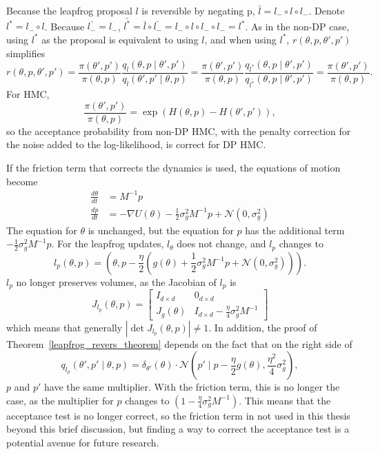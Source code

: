 \documentclass[english,twoside,openright]{HYgraduMLDS}
\newcommand{\caln}{{\mathcal{N}}}
\begin{document}
Because the leapfrog proposal \(l\) is reversible by negating p,
\(\bar{l} = l_{-} \circ l\circ l_{-}\). Denote \(l^{*} = l_{-}\circ l\).
Because \(\bar{l_{-}} = l_{-}\),
\(\bar{l^{*}} = \bar{l}\circ \bar{l_{-}}
= l_{-}\circ l\circ l_{-}\circ l_{-} = l^{*}\).
As in the non-DP case, using \(l^{*}\) as the proposal is equivalent to using
\(l\), and when using \(l^{*}\), \(r(\theta, p, \theta', p')\) simplifies
\[
  r(\theta, p, \theta', p')
  = \frac{\pi(\theta', p')}{\pi(\theta, p)}
  \frac{q_{l}(\theta, p\mid \theta', p')}{q_{l}(\theta', p'\mid \theta, p)}
  = \frac{\pi(\theta', p')}{\pi(\theta, p)}
  \frac{q_{l^{*}}(\theta, p\mid \theta', p')}{q_{\bar{l^{*}}}(\theta, p\mid \theta', p')}
  = \frac{\pi(\theta', p')}{\pi(\theta, p)}.
\]
For HMC,
\[
  \frac{\pi(\theta', p')}{\pi(\theta, p)} = \exp(H(\theta, p) - H(\theta', p')),
\]
so the acceptance probability from non-DP HMC, with the penalty correction for
the noise added to the log-likelihood, is correct for DP HMC.

If the friction term that corrects the dynamics is used, the equations of
motion become~\cite{CFG14}
\begin{align*}
  \frac{d\theta}{dt} &= M^{-1}p \\
  \frac{dp}{dt} &= -\nabla U(\theta) - \frac{1}{2}\sigma_{g}^{2}M^{-1}p + \caln(0, \sigma_{g}^{2})
\end{align*}
The equation for \(\theta\) is unchanged, but the equation for \(p\) has the
additional term \(-\frac{1}{2}\sigma_{g}^{2}M^{-1}p\).
For the leapfrog updates, \(l_{\theta}\) does not change, and \(l_{p}\) changes
to
\[
  l_{p}(\theta, p) = \left(\theta, p - \frac{\eta}{2}(g(\theta)
  + \frac{1}{2}\sigma_{g}^{2}M^{-1}p + \caln(0, \sigma_{g}^{2}))\right).
\]
\(l_{p}\) no longer preserves volumes, as the Jacobian of \(l_{p}\) is
\[
  J_{l_{p}}(\theta, p) =
  \begin{bmatrix}
    I_{d\times d} & 0_{d\times d} \\
    J_{g}(\theta) & I_{d\times d} - \frac{\eta}{4}\sigma_{g}^{2}M^{-1}
  \end{bmatrix}
\]
which means that generally \(|\det J_{l_{p}}(\theta, p)| \neq 1\).
In addition, the proof of Theorem~\ref{leapfrog_revers_theorem} depends on the
fact that on the right side of
\[
  q_{l_{p}}(\theta', p'\mid \theta, p)
  = \delta_{\theta'}(\theta)\cdot \caln\left(p'\mid p
    - \frac{\eta}{2}g(\theta), \frac{\eta^{2}}{4}\sigma_{g}^{2}\right),
\]
\(p\) and \(p'\) have the same multiplier. With the friction term, this is
no longer the case, as the multiplier for \(p\) changes to
\((1 - \frac{\eta}{4}\sigma_{g}^{2}M^{-1})\).
This means that the acceptance test is no longer correct, so
the friction term in not used in this thesis beyond this brief discussion,
but finding a way to correct the acceptance test is a potential avenue for
future research.
\end{document}
